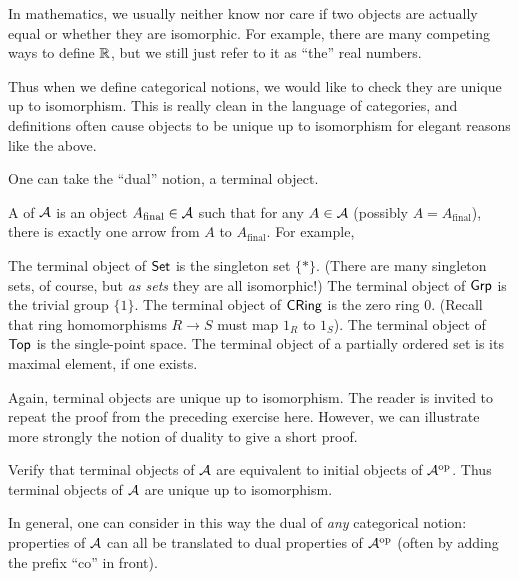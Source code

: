 \begin{remark}
	In mathematics, we usually neither know nor care if two objects are actually equal
	or whether they are isomorphic.
	For example, there are many competing ways to define $\RR$,
	but we still just refer to it as ``the'' real numbers.

	Thus when we define categorical notions, we would like to check they are
	unique up to isomorphism.
	This is really clean in the language of categories, and definitions
	often cause objects to be unique up to isomorphism for elegant reasons like the above.
\end{remark}

One can take the ``dual'' notion, a terminal object.
\begin{example}
	A  of $\AA$ is an object
	$A_{\text{final}} \in \AA$ such that for any $A \in \AA$ (possibly $A = A_{\text{final}}$),
	there is exactly one arrow from $A$ to $A_{\text{final}}$.
	For example,
	\begin{enumerate}[(a)]
		\ii The terminal object of $\catname{Set}$ is the singleton set $\{\ast\}$.
		(There are many singleton sets, of course, but \emph{as sets} they are all isomorphic!)
		\ii The terminal object of $\catname{Grp}$ is the trivial group $\{1\}$.
		\ii The terminal object of $\catname{CRing}$ is the zero ring $0$.
		(Recall that ring homomorphisms $R \to S$ must map $1_R$ to $1_S$).
		\ii The terminal object of $\catname{Top}$ is the single-point space.
		\ii The terminal object of a partially ordered set is its maximal element, if one exists.
	\end{enumerate}
\end{example}

Again, terminal objects are unique up to isomorphism.
The reader is invited to repeat the proof from the preceding exercise here.
However, we can illustrate more strongly the notion of duality to give a short proof.
\begin{ques}
	Verify that terminal objects of $\AA$ are equivalent to initial objects of $\AA\op$.
	Thus terminal objects of $\AA$ are unique up to isomorphism.
\end{ques}
In general, one can consider in this way the dual of \emph{any} categorical notion:
properties of $\AA$ can all be translated to dual properties of $\AA\op$
(often by adding the prefix ``co'' in front).


